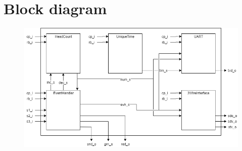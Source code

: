 \documentclass[12pt,a4 paper] {report}
\begin{document}
\section{Block diagram}
\begin{figure}[h]
	\centering	
	\includegraphics[scale=0.6]{../png/top.png}
\end{figure}

\newpage
\end{document}
